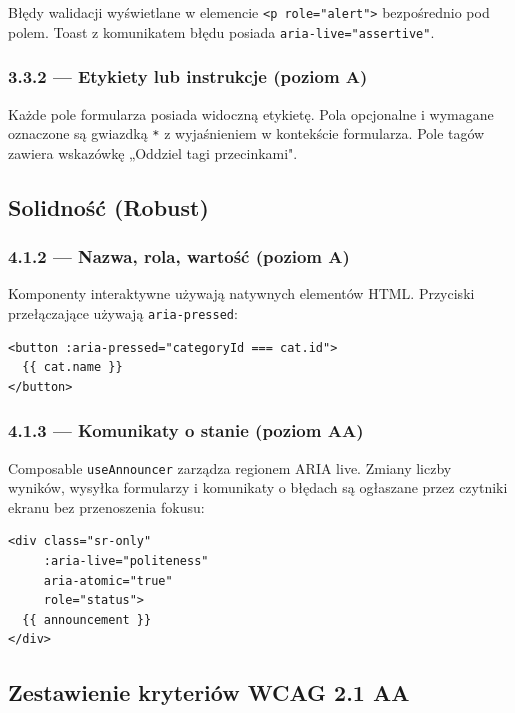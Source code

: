 \documentclass[12pt, a4paper]{article}
\begin{document}
Błędy walidacji wyświetlane w elemencie \texttt{<p role="alert">} bezpośrednio
pod polem. Toast z komunikatem błędu posiada \texttt{aria-live="assertive"}.

\subsubsection{3.3.2 — Etykiety lub instrukcje (poziom A)}

Każde pole formularza posiada widoczną etykietę. Pola opcjonalne i wymagane oznaczone
są gwiazdką \texttt{*} z wyjaśnieniem w kontekście formularza. Pole tagów zawiera
wskazówkę „Oddziel tagi przecinkami".

\subsection{Solidność (Robust)}

\subsubsection{4.1.2 — Nazwa, rola, wartość (poziom A)}

Komponenty interaktywne używają natywnych elementów HTML. Przyciski przełączające
używają \texttt{aria-pressed}:

\begin{lstlisting}[style=html, caption={Użycie aria-pressed na chipach filtrów}]
<button :aria-pressed="categoryId === cat.id">
  {{ cat.name }}
</button>
\end{lstlisting}

\subsubsection{4.1.3 — Komunikaty o stanie (poziom AA)}

Composable \texttt{useAnnouncer} zarządza regionem ARIA live. Zmiany liczby wyników,
wysyłka formularzy i komunikaty o błędach są ogłaszane przez czytniki ekranu
bez przenoszenia fokusu:

\begin{lstlisting}[style=html, caption={Region ARIA live w App.vue}]
<div class="sr-only"
     :aria-live="politeness"
     aria-atomic="true"
     role="status">
  {{ announcement }}
</div>
\end{lstlisting}

\subsection{Zestawienie kryteriów WCAG 2.1 AA}
\end{document}
